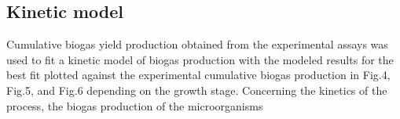 \subsection{Kinetic model}
Cumulative biogas yield production obtained from the experimental assays was used to fit a kinetic model of biogas production with the modeled results for the best fit plotted against the experimental cumulative biogas production in Fig.4, Fig.5, and Fig.6 depending on the growth stage.
Concerning the kinetics of the process, the biogas production of the microorganisms